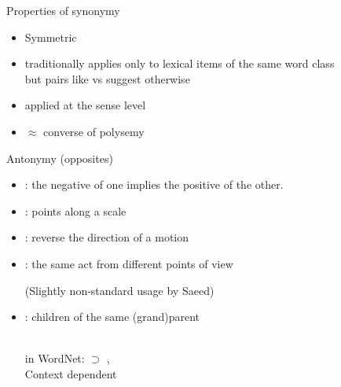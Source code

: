 \documentclass{beamer}
\begin{document}
\begin{frame}{Properties of synonymy}

  \begin{itemize}
  \item Symmetric
  \item traditionally applies only to lexical items of the same word class
    \\ but pairs like  vs  suggest otherwise
  \item applied at the sense level
  \item $\approx$ converse of polysemy
  \end{itemize}


\end{frame}

\begin{frame}[allowframebreaks]{Antonymy (opposites)}


\begin{itemize}
\item {}: the negative of one implies the positive of the other.
  \begin{exe}
    \ex {}
    \ex {}
  \end{exe}
\item {}: points  along a scale
  \begin{exe}
    \ex {}
    \ex {}
  \end{exe}
\item {}: reverse the direction of a motion
  \begin{exe}
    \ex {}
    \ex {}
  \end{exe}
\framebreak
\item {}: the same act from different points of view
  \begin{exe}
    \ex {}
    \ex {}
  \end{exe}
  (Slightly non-standard usage by Saeed)
\item {}: children of the same (grand)parent
  \begin{exe}
    \ex {}
    \\ \textnormal{in WordNet:}  $\supset$ , 
    \ex {}
    \\  \textnormal{Context dependent}
  \end{exe}
\end{itemize}
\end{frame}
\end{document}
